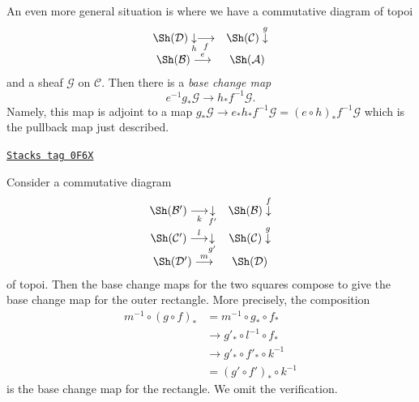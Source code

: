 \medskip\noindent
An even more general situation is where we have a commutative diagram of topoi
$$
\begin{array}{cc}\Sh(\mathcal{D}) \underset{h}{\downarrow}\underset{f}{\longrightarrow} & \Sh(\mathcal{C}) \overset{g}{\downarrow} \\ \Sh(\mathcal{B}) \overset{e}{\longrightarrow} & \Sh(\mathcal{A})\end{array}
$$
and a sheaf $\mathcal{G}$ on $\mathcal{C}$. Then there is a
{\it base change map}
$$
e^{-1}g_*\mathcal{G} \longrightarrow h_*f^{-1}\mathcal{G}.
$$
Namely, this map is adjoint to a map
$g_*\mathcal{G} \to e_*h_*f^{-1}\mathcal{G} = (e \circ h)_*f^{-1}\mathcal{G}$
which is the pullback map just described.

\begin{remark}
\label{sites-remark-compose-base-change}
\href{https://stacks.math.columbia.edu/tag/0F6X}{\texttt{Stacks tag 0F6X}}

Consider a commutative diagram
$$
\begin{array}{cc}\Sh(\mathcal{B}') \underset{k}{\longrightarrow}\underset{f'}{\downarrow} & \Sh(\mathcal{B}) \overset{f}{\downarrow} \\ \Sh(\mathcal{C}') \overset{l}{\longrightarrow}\underset{g'}{\downarrow} & \Sh(\mathcal{C}) \overset{g}{\downarrow} \\ \Sh(\mathcal{D}') \overset{m}{\longrightarrow} & \Sh(\mathcal{D})\end{array}
$$
of topoi. Then the base change maps for the two squares compose to give the
base change map for the outer rectangle. More precisely, the composition
\begin{align*}
m^{-1} \circ (g \circ f)_*
& =
m^{-1} \circ g_* \circ f_* \\
& \to g'_* \circ l^{-1} \circ f_* \\
& \to g'_* \circ f'_* \circ k^{-1} \\
& = (g' \circ f')_* \circ k^{-1}
\end{align*}
is the base change map for the rectangle. We omit the verification.
\end{remark}

